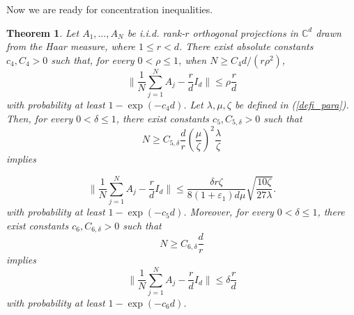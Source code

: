 \documentclass{article}
\renewcommand{\eqref}[1]{(\ref{#1})}
\newcommand{\C}{{\mathbb C}}
\newcommand{\0}{{\mathbf 0}}
\newtheorem{theorem}{Theorem}[section]
\numberwithin{equation}{section}
\begin{document}
	Now we are ready for concentration inequalities.
	\begin{theorem}
		\label{theo:concentration1}
		Let $A_1,\ldots,A_N$ be i.i.d. rank-$r$ orthogonal projections in $\C^d$ drawn from the Haar measure, where $1\le r<d$. 
		There exist absolute constants $c_4,C_4>0$ such that, for every $0<\rho\le1$, when $N\ge C_4d/(r\rho^2)$,
		\[
		\Big\|\frac1N\sum_{j=1}^N A_j-\frac rd I_d\Big\|\le \rho\frac rd
		\]
		with probability at least $1-\exp(-c_4d)$. Let $\lambda,\mu,\zeta$ be defined in \eqref{defi_para}. Then, 
		for every $0<\delta\le1$, there exist constants $c_{5},C_{5,\delta}>0$ such that
		\begin{equation}\label{eq:N_sqrt_lambda_zeta}
			N\ge C_{5,\delta}\frac dr\left(\frac{\mu}{\zeta}\right)^2\frac{\lambda}{\zeta}
		\end{equation}
		implies
		
        \[
        \Big\|\frac1N\sum_{j=1}^N A_j-\frac rd I_d\Big\|\le
        \frac{\delta r\zeta}{8(1+\varepsilon_1)d\mu}\sqrt{\frac{10\zeta}{27\lambda}}.
        \]
		with probability at least $1-\exp(-c_{5}d)$. Moreover, for every $0<\delta\le1$, there exist constants $c_{6},C_{6,\delta}>0$ such that
		\begin{equation}\label{eq:N_constant}
			N\ge C_{6,\delta}\frac dr
		\end{equation}
		implies
		\[
		\Big\|\frac1N\sum_{j=1}^N A_j-\frac rd I_d\Big\|\le \delta\frac rd
		\]
		with probability at least $1-\exp(-c_{6}d)$.
	\end{theorem}
\end{document}
